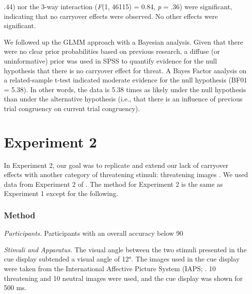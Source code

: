 \documentclass{article}
\begin{document}
.44) nor the 3-way interaction (\emph{F}(1, 46115) = 0.84, \emph{p }= .36) were significant, indicating that no carryover effects were observed. No other effects were significant.



	We followed up the GLMM approach with a Bayesian analysis. Given that there were no clear prior probabilities based on previous research, a diffuse (or uninformative) prior was used in SPSS to quantify evidence for the null hypothesis that there is no carryover effect for threat. A Bayes Factor analysis on a related-sample t-test indicated moderate evidence for the null hypothesis (BF01 = 5.38). In other words, the data is 5.38 times as likely under the null hypothesis than under the alternative hypothesis (i.e., that there is an influence of previous trial congruency on current trial congruency).



	\section{Experiment 2}



	In Experiment 2, our goal was to replicate and extend our lack of carryover effects with another category of threatening stimuli: threatening images \parencite{Lang2008}. We used data from Experiment 2 of \parencite{Carlson2020}. The method for Experiment 2 is the same as Experiment 1 except for the following.



	\subsubsection{Method}



	\emph{Participants. }Participants with an overall accuracy below 90%



	\emph{Stimuli and Apparatus. }The visual angle between the two stimuli presented in the cue display subtended a visual angle of 12°. The images used in the cue display were taken from the International Affective Picture System (IAPS; \parencite{Lang2008}. 10 threatening and 10 neutral images were used, and the cue display was shown for 500 ms.
\end{document}
